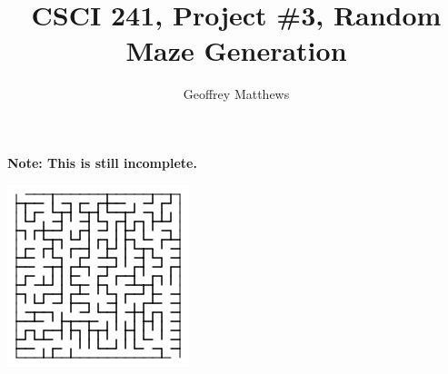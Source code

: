 \documentclass{article}
\title{CSCI 241, Project \#3, Random Maze Generation}
\author{Geoffrey Matthews}
\begin{document}
\maketitle

\centerline{\bf Note:  This is still incomplete.}


\centerline{\includegraphics[scale=0.5]{maze.png}}
\end{document}
